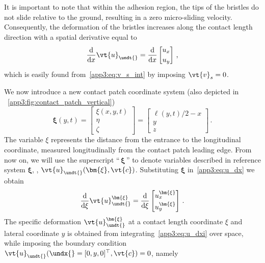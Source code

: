 It is important to note that within the adhesion region, the tips of the bristles do not slide relative to the ground, resulting in a zero micro-sliding velocity. Consequently, the deformation of the bristles increases along the contact length direction with a spatial derivative equal to
%
\begin{equation}
  \dfrac{\mathrm{d}}{\mathrm{d}x}\vt{u}_{\undt{}} =
  \dfrac{\mathrm{d}}{\mathrm{d}x}
  \begin{bmatrix}
    u_x \\[0.2em]
    u_y
  \end{bmatrix} \, \text{,}
  \label{app3:eq:u_dx}
\end{equation}
%
which is easily found from~\eqref{app3:eq:v_s_int} by imposing $\vt{v}_s = 0$.

We now introduce a new contact patch coordinate system (also depicted in \figurename~\ref{app3:fig:contact_patch_vertical})
%
\begin{equation*}
  \bm{\xi}(y,t) =
  \begin{bmatrix}
    \xi(x,y,t) \\[0.2em]
    \eta \\[0.2em]
    \zeta
  \end{bmatrix}
  =
  \begin{bmatrix}
    \ell(y,t)/2-x \\[0.2em]
    y \\[0.2em]
    z
  \end{bmatrix} \, \text{.}
\end{equation*}
%
The variable $\xi$ represents the distance from the entrance to the longitudinal coordinate, measured longitudinally from the contact patch leading edge. From now on, we will use the superscript ``$\,\bm{\xi}\,$'' to denote variables described in reference system $\bm{\xi}$, \eg{}, $\vt{u}_{\undt{}}(\bm{\xi},\vt{c})$. Substituting $\bm{\xi}$ in~\eqref{app3:eq:u_dx} we obtain
%
\begin{equation}
  \dfrac{\mathrm{d}}{\mathrm{d}\xi}\vt{u}_{\undt{}}^{\bm{\xi}} =
  \dfrac{\mathrm{d}}{\mathrm{d}\xi}
  \begin{bmatrix}
    u_{x}^{\bm{\xi}} \\[0.2em]
    u_{y}^{\bm{\xi}}
  \end{bmatrix} \, \text{.}
  \label{app3:eq:u_dxi}
\end{equation}
%
The specific deformation $\vt{u}_{\undt{}}^{\bm{\xi}}$ at a contact length coordinate $\xi$ and lateral coordinate $y$ is obtained from integrating~\eqref{app3:eq:u_dxi} over space, while imposing the boundary condition $\vt{u}_{\undt{}}(\undx{} = [0,y,0]^\top,\vt{c}) = 0$, namely
